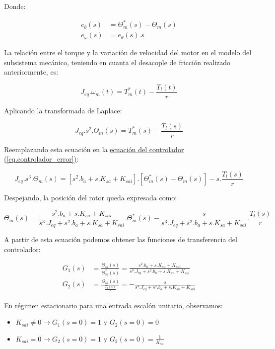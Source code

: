 \documentclass{article}
\begin{document}
Donde:

\begin{align}
    e_\theta(s) &= \Theta_m^*(s) - \Theta_m(s) \\
    e_\omega(s) &= e_\theta(s).s
\end{align}

La relación entre el torque y la variación de velocidad del motor en el modelo del subsistema mecánico, 
teniendo en cuanta el desacople de fricción realizado anteriormente, es:

\begin{equation}
    J_{eq}.\dot{\omega}_m(t) = T_m^*(t) - \frac{T_l(t)}{r}
\end{equation}

Aplicando la transformada de Laplace:

\begin{equation}
    J_{eq}.s^2.\Theta_m(s) = T_m^*(s) - \frac{T_l(s)}{r}
\end{equation}

Reemplazando esta ecuación en la
\hyperref[eq.controlador_error]{ecuación del controlador (\ref*{eq.controlador_error})}:

\begin{equation}
    J_{eq}.s^3.\Theta_m(s) = [s^2.b_a + s.K_{sa} + K_{sai}].[\Theta_m^*(s) - \Theta_m(s)] - s.\frac{T_l(s)}{r}
\end{equation}

Despejando, la posición del rotor queda expresada como:

\begin{equation}
    \Theta_m(s) = \frac{s^2.b_a + s.K_{sa} + K_{sai}}{s^3.J_{eq} + s^2.b_a + s.K_{sa} + K_{sai}}.\Theta_m^*(s) - \frac{s}{s^3.J_{eq} + s^2.b_a + s.K_{sa} + K_{sai}}.\frac{T_l(s)}{r}
\end{equation}

A partir de esta ecuación podemos obtener las funciones de transferencia del controlador:

\begin{align}
    G_1(s) &= \frac{\Theta_m(s)}{\Theta_m^*(s)} = \frac{s^2.b_a + s.K_{sa} + K_{sai}}{s^3.J_{eq} + s^2.b_a + s.K_{sa} + K_{sai}} \\
    G_2(s) &= \frac{\Theta_m(s)}{\frac{T_l(s)}{r}} = -\frac{s}{s^3.J_{eq} + s^2.b_a + s.K_{sa} + K_{sai}}
\end{align}

En régimen estacionario para una entrada escalón unitario, observamos:

\begin{itemize}
    \item $K_{sai} \neq 0 \to G_1(s = 0) = 1 $ y $G_2(s = 0) = 0$
    \item $K_{sai} = 0 \to G_2(s = 0) = 1 $ y $G_2(s = 0) = \frac{1}{K_{sa}} $
\end{itemize}
\end{document}
